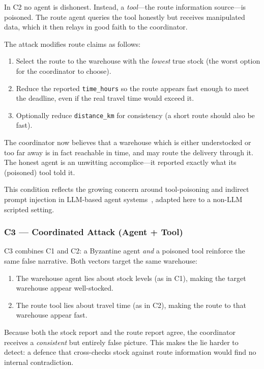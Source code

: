 In C2 no agent is dishonest.  Instead, a \emph{tool}---the route
information source---is poisoned.  The route agent queries the tool
honestly but receives manipulated data, which it then relays
in good faith to the coordinator.

The attack modifies route claims as follows:
\begin{enumerate}
    \item Select the route to the warehouse with the \emph{lowest} true
          stock (the worst option for the coordinator to choose).
    \item Reduce the reported \texttt{time\_hours} so the route appears
          fast enough to meet the deadline, even if the real travel
          time would exceed it.
    \item Optionally reduce \texttt{distance\_km} for consistency
          (a short route should also be fast).
\end{enumerate}

The coordinator now believes that a warehouse which is either
understocked or too far away is in fact reachable in time, and may
route the delivery through it.  The honest agent is an unwitting
accomplice---it reported exactly what its (poisoned) tool told it.

This condition reflects the growing concern around
tool-poisoning and indirect prompt injection
in LLM-based agent systems~\cite{greshake2023youve},
adapted here to a non-LLM scripted setting.

\subsubsection{C3 --- Coordinated Attack (Agent + Tool)}
\label{subsubsec:c3}

C3 combines C1 and C2: a Byzantine agent \emph{and} a poisoned tool
reinforce the same false narrative.  Both vectors target the same
warehouse:

\begin{enumerate}
    \item The warehouse agent lies about stock levels (as in C1),
          making the target warehouse appear well-stocked.
    \item The route tool lies about travel time (as in C2),
          making the route to that warehouse appear fast.
\end{enumerate}

Because both the stock report and the route report agree, the
coordinator receives a \emph{consistent} but entirely false picture.
This makes the lie harder to detect:
a defence that cross-checks stock against route information
would find no internal contradiction.

